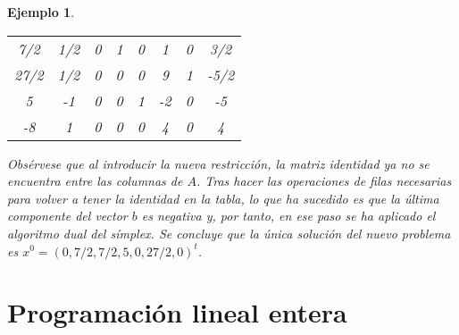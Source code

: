 \documentclass[11pt]{report}
\theoremstyle{mytheorem}
\theoremstyle{mydefinition}
\theoremstyle{myexample}
\newtheorem*{example}{Ejemplo}
\begin{document}
\begin{example}
\begin{center}
\begin{tabular}{|c|c|c|c|c|c|c|c|}
    \phantom{-}7/2 & \multicolumn{1}{c}{\phantom{-}1/2} & \multicolumn{1}{c}{0} & \multicolumn{1}{c}{\phantom{-}1} & \multicolumn{1}{c}{\phantom{-}0}& \multicolumn{1}{c}{\phantom{-}1} & \multicolumn{1}{c}{0} & \multicolumn{1}{c|}{\phantom{-}3/2} \\
    
    \phantom{-}27/2 & \multicolumn{1}{c}{\phantom{-}1/2} & \multicolumn{1}{c}{\phantom{-}0} & \multicolumn{1}{c}{\phantom{-}0} & \multicolumn{1}{c}{\phantom{-}0}& \multicolumn{1}{c}{\phantom{-}9} & \multicolumn{1}{c}{1} & \multicolumn{1}{c|}{-5/2} \\
    
    \phantom{-}5 & \multicolumn{1}{c}{-1} & \multicolumn{1}{c}{\phantom{-}\phantom{-}0} & \multicolumn{1}{c}{\phantom{-}0} & \multicolumn{1}{c}{\phantom{-}1} & \multicolumn{1}{c}{-2} & \multicolumn{1}{c}{0} & \multicolumn{1}{c|}{-5} \\ \cline{1-8}
    
    -8 & \multicolumn{1}{c}{\phantom{-}1} & \multicolumn{1}{c}{\phantom{-}0} & \multicolumn{1}{c}{\phantom{-}0} & \multicolumn{1}{c}{\phantom{-}0} & \multicolumn{1}{c}{\phantom{-}4} & \multicolumn{1}{c}{0} & \multicolumn{1}{c|}{\phantom{-}4} \\ \cline{1-8}
\end{tabular}
\end{center}

\noindent Obsérvese que al introducir la nueva restricción, la matriz identidad ya no se encuentra entre las columnas de $A$. Tras hacer las operaciones de filas necesarias para volver a tener la identidad en la tabla, lo que ha sucedido es que la última componente del vector $b$ es negativa y, por tanto, en ese paso se ha aplicado el algoritmo dual del símplex. Se concluye que la única solución del nuevo problema es $x^0 = (0,7/2,7/2,5,0,27/2,0)^t$.

\end{example}

\chapter{Programación lineal entera}
\end{document}
